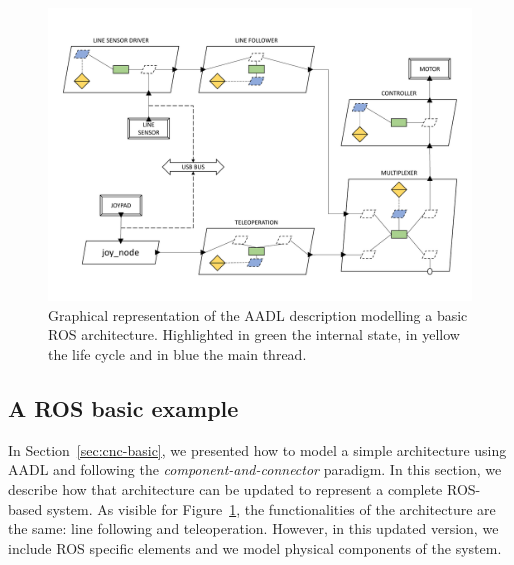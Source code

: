 \begin{landscape}
	\begin{figure}[t]
	\centering
	\includegraphics[height=0.88\textwidth]{gfx/arch_figures-15}
	\caption[Graphical representation of the AADL description modelling a basic ROS architecture.]{Graphical representation of the AADL description modelling a basic ROS architecture. Highlighted in green the internal state, in yellow the life cycle and in blue the main thread.}
	\label{fig:ros-arch}
	\end{figure}
\end{landscape}

\subsection{A ROS basic example}
In Section~\ref{sec:cnc-basic}, we presented how to model a simple architecture using AADL and following the \textit{component-and-connector} paradigm. In this section, we describe how that architecture can be updated to represent a complete ROS-based system. As visible for Figure~\ref{fig:ros-arch}, the functionalities of the architecture are the same: line following and teleoperation. However, in this updated version, we include ROS specific elements and we model physical components of the system.

